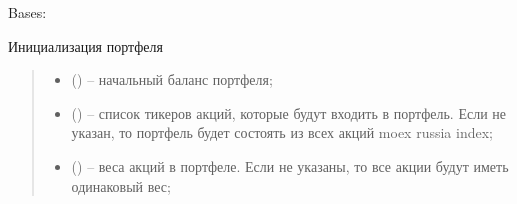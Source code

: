 \documentclass[letterpaper,10pt,english,openany,oneside]{sphinxmanual}
\begin{document}
\begin{fulllineitems}
\label{\detokenize{src.structures:src.structures.st_portfolio.Portfolio}}
\pysigstartsignatures
{}
\pysigstopsignatures
\sphinxAtStartPar
Bases: 

\begin{fulllineitems}
\label{\detokenize{src.structures:src.structures.st_portfolio.Portfolio.__init__}}
\pysigstartsignatures
{}
\pysigstopsignatures
\sphinxAtStartPar
Инициализация портфеля
\begin{quote}\begin{description}
\begin{itemize}
\item {} 
\sphinxAtStartPar
{} (\sphinxstyleliteralemphasis{\sphinxupquote{{[}}}\sphinxstyleliteralemphasis{\sphinxupquote{, }}\sphinxstyleliteralemphasis{\sphinxupquote{{]}}}) – начальный баланс портфеля;

\item {} 
\sphinxAtStartPar
{} (\sphinxstyleliteralemphasis{\sphinxupquote{{[}}}\sphinxstyleliteralemphasis{\sphinxupquote{{[}}}\sphinxstyleliteralemphasis{\sphinxupquote{{]}}}\sphinxstyleliteralemphasis{\sphinxupquote{{]}}}) – список тикеров акций, которые будут входить в портфель. Если не указан, то портфель будет
состоять из всех акций moex russia index;

\item {} 
\sphinxAtStartPar
{} (\sphinxstyleliteralemphasis{\sphinxupquote{{[}}}\sphinxstyleliteralemphasis{\sphinxupquote{{[}}}\sphinxstyleliteralemphasis{\sphinxupquote{{]}}}\sphinxstyleliteralemphasis{\sphinxupquote{{]}}}) – веса акций в портфеле. Если не указаны, то все акции будут иметь одинаковый вес;


\end{itemize}
\end{description}
\end{quote}
\end{fulllineitems}
\end{fulllineitems}
\end{document}
